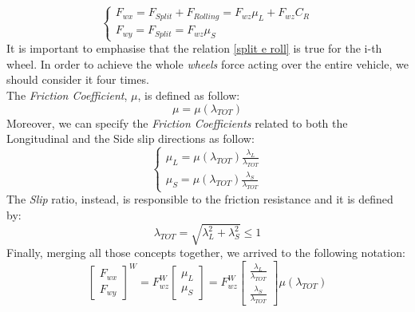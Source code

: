 \documentclass[a4paper,12pt,titlepage]{report}
\begin{document}
			\begin{equation} \label{split e roll}
				\begin{cases}
					F_{wx} = F_{Split} + F_{Rolling} = F_{wz} \mu_{L} + F_{wz} C_{R} \\
					F_{wy} = F_{Split} = F_{wz} \mu_{S}
				\end{cases}
			\end{equation}
		It is important to emphasise that the relation \ref{split e roll} is true for the i-th wheel. In order to achieve the whole \textit{wheels} force acting over the entire vehicle, we should consider it four times. \\ The \textit{Friction Coefficient}, $ \mu $, is defined as follow:
			\begin{equation}
				\mu = \mu(\lambda_{TOT})
			\end{equation}
		Moreover, we can specify the \textit{Friction Coefficients} related to both the Longitudinal and the Side slip directions as follow:
			\begin{equation}
				\begin{cases}
					\mu_{L} = \mu(\lambda_{TOT}) \frac{\lambda_{L}}{\lambda_{TOT}}\\
					\mu_{S} = \mu(\lambda_{TOT}) \frac{\lambda_{S}}{\lambda_{TOT}}
				\end{cases}
			\end{equation}
		The \textit{Slip} ratio, instead, is responsible to the friction resistance and it is defined by:
			\begin{equation}
			\lambda_{TOT} = \sqrt{\lambda_{L}^{2} + \lambda_{S}^{2}} \leq 1
			\end{equation}
		Finally, merging all those concepts together, we arrived to the following notation:	
			\begin{equation} \label{Force 1st part}
				\begin{bmatrix}
					F_{wx} \\
					F_{wy}
				\end{bmatrix}^{W} = 
				F_{wz}^{W}
				\begin{bmatrix}
					\mu_{L} \\
					\mu_{S}
				\end{bmatrix} = 
				F_{wz}^{W}
				\begin{bmatrix}
					\frac{\lambda_{L}}{\lambda_{TOT}} \\
					\frac{\lambda_{S}}{\lambda_{TOT}}
				\end{bmatrix}
				\mu(\lambda_{TOT})	
			\end{equation}
\end{document}
